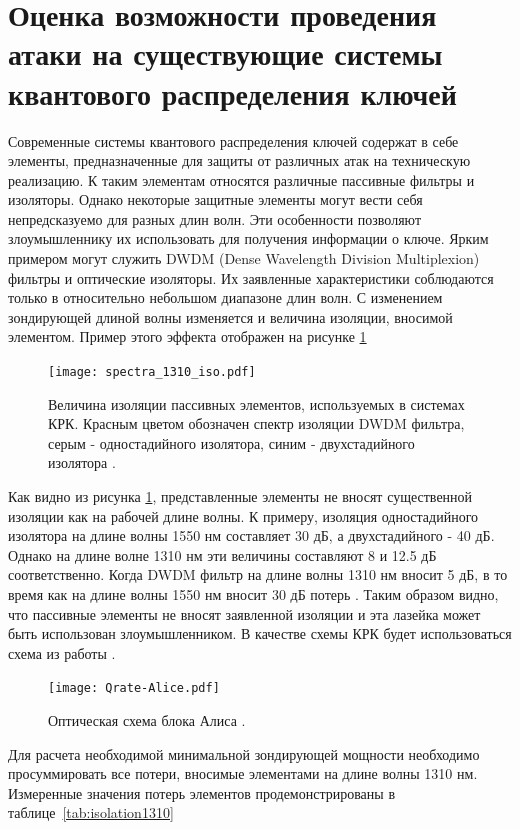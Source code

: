 \section{Оценка возможности проведения атаки на существующие системы квантового распределения ключей}\label{sec:ch4/sect6}
Современные системы квантового распределения ключей содержат в себе элементы, предназначенные для защиты от различных атак на техническую реализацию. К таким элементам относятся различные пассивные фильтры и изоляторы.
Однако некоторые защитные элементы могут вести себя непредсказуемо для разных длин волн. Эти особенности позволяют злоумышленнику их использовать для получения информации о ключе.
Ярким примером могут служить DWDM (Dense Wavelength Division Multiplexion) фильтры и оптические изоляторы. Их заявленные характеристики соблюдаются только в относительно небольшом диапазоне длин волн.
С изменением зондирующей длиной волны изменяется и величина изоляции, вносимой элементом. Пример этого эффекта отображен на рисунке \ref{fig:isolation_spectrums}
\begin{figure}
    \centering
    \texttt{[image: spectra\_1310\_iso.pdf]}
    \caption{Величина изоляции пассивных элементов, используемых в системах КРК. Красным цветом обозначен спектр изоляции DWDM фильтра, серым - одностадийного изолятора, синим - двухстадийного изолятора \cite{fadeev2025}.}
    \label{fig:isolation_spectrums}
\end{figure}
Как видно из рисунка \ref{fig:isolation_spectrums}, представленные элементы не вносят существенной изоляции как на рабочей длине волны. К примеру, изоляция одностадийного изолятора на длине волны 1550 нм составляет 30 дБ, а двухстадийного - 40 дБ. Однако на длине волне 1310 нм эти величины составляют 8 и 12.5 дБ соответственно.
Когда DWDM фильтр на длине волны 1310 нм вносит 5 дБ, в то время как на длине волны 1550 нм вносит 30 дБ потерь \cite{ponosova2022}. Таким образом видно, что пассивные элементы не вносят заявленной изоляции и эта лазейка может быть использован злоумышленником.
В качестве схемы КРК будет использоваться схема из работы \cite{makarov2023}. 
\begin{figure}
    \centering
    \texttt{[image: Qrate-Alice.pdf]}
    \caption{Оптическая схема блока Алиса \cite{fadeev2025}.}\label{fig:Alice_qrate}
\end{figure}
Для расчета необходимой минимальной зондирующей мощности необходимо просуммировать все потери, вносимые элементами на длине волны 1310 нм. 
Измеренные значения потерь элементов продемонстрированы в таблице~\ref{tab:isolation1310}
